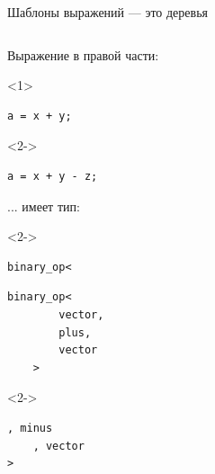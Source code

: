 \documentclass[@BEAMER_OPTIONS@]{beamer}
\begin{document}
\note{ }

\begin{frame}[fragile]{Шаблоны выражений --- это деревья}
    \begin{columns}
        \begin{column}{0.45\textwidth}
            \begin{exampleblock}{Выражение в правой части:}
                \begin{onlyenv}<1>
                    \begin{lstlisting}
a = x + y;
                    \end{lstlisting}
                \end{onlyenv}
                \begin{onlyenv}<2->
                    \begin{lstlisting}
a = x + y - z;
                    \end{lstlisting}
                \end{onlyenv}
            \end{exampleblock}
            \begin{exampleblock}{... имеет тип:}
                \begin{uncoverenv}<2->
                    \begin{lstlisting}[numbers=none]
binary_op<
                    \end{lstlisting}
                \end{uncoverenv}
                \begin{lstlisting}[numbers=none]
    binary_op<
        vector,
        plus,
        vector
    >
                \end{lstlisting}
                \begin{uncoverenv}<2->
                    \begin{lstlisting}[numbers=none]
    , minus
    , vector
>
                    \end{lstlisting}
                \end{uncoverenv}
            \end{exampleblock}
        \end{column}
        \begin{column}{0.45\textwidth}
            \begin{figure}
\end{figure}
\end{column}
\end{columns}
\end{frame}
\end{document}
